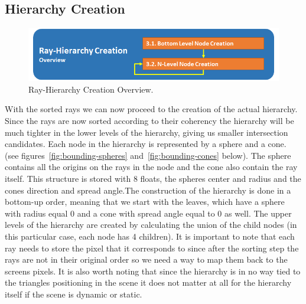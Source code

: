 \documentclass{llncs}
\begin{document}
%
\subsection{Hierarchy Creation}
%

\begin{figure}
\centering
\includegraphics[scale=0.60]{images/figure 4.png}
\caption{Ray-Hierarchy Creation Overview.}
\end{figure}

With the sorted rays we can now proceed to the creation of the actual hierarchy. Since the rays are now sorted according to their coherency the hierarchy will be much tighter in the lower levels of the hierarchy, giving us smaller intersection candidates.
Each node in the hierarchy is represented by a sphere and a cone. (see figures~\ref{fig:bounding-spheres} and~\ref{fig:bounding-cones} below).  The sphere contains all the origins on the rays in the node and the cone also contain the ray itself. This structure  is stored with 8 floats, the spheres center and radius and the cones direction and spread angle.The construction of the hierarchy is done in a bottom-up order, meaning that we start with the leaves, which have a sphere with radius equal 0 and a cone with spread angle equal to 0 as well. The upper levels of the hierarchy are created by calculating the union of the child nodes (in this particular case, each node has 4 children). It is important to note that each ray needs to store the pixel that it corresponds to since after the sorting step the rays are not in their original order so we need a way to map them back to the screens pixels. It is also worth noting that since the hierarchy is in no way tied to the triangles positioning in the scene it does not matter at all for the hierarchy itself  if the scene is dynamic or static.
\end{document}
